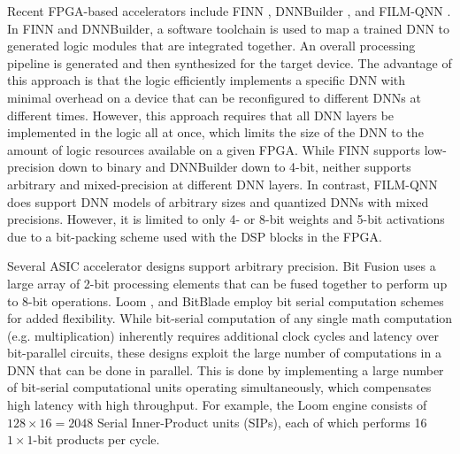 \documentclass[sigconf]{acmart}
\begin{document}

Recent FPGA-based accelerators include FINN \cite{umuroglu2017finn, blott2018finnr}, DNNBuilder \cite{zhang2018dnnbuilder}, and FILM-QNN \cite{sun2022film}. In FINN and DNNBuilder, a software toolchain is used to map a trained DNN to generated logic modules that are integrated together. An overall processing pipeline is generated and then synthesized for the target device. The advantage of this approach is that the logic efficiently implements a specific DNN with minimal overhead on a device that can be reconfigured to different DNNs at different times. However, this approach requires that all DNN layers be implemented in the logic all at once, which limits the size of the DNN to the amount of logic resources available on a given FPGA. While FINN supports low-precision down to binary and DNNBuilder down to 4-bit, neither supports arbitrary and mixed-precision at different DNN layers. In contrast, FILM-QNN does support DNN models of arbitrary sizes and quantized DNNs with mixed precisions. However, it is limited to only 4- or 8-bit weights and 5-bit activations due to a bit-packing scheme used with the DSP blocks in the FPGA.

Several ASIC accelerator designs support arbitrary precision. Bit Fusion \cite{sharma2018bit} uses a large array of 2-bit processing elements that can be fused together to perform up to 8-bit operations. Loom \cite{sharify2018loom}, and BitBlade \cite{ryu2019bitblade} employ bit serial computation schemes for added flexibility.
While bit-serial computation of any single math computation (e.g. multiplication) inherently requires additional clock cycles and latency over bit-parallel circuits, these designs exploit the large number of computations in a DNN that can be done in parallel. This is done by implementing a large number of bit-serial computational units operating simultaneously, which  compensates high latency with high throughput. For example, the Loom engine consists of $128 \times 16 = 2048$ Serial Inner-Product units (SIPs), each of which performs 16 $1 \times 1$-bit products per cycle.
\end{document}
